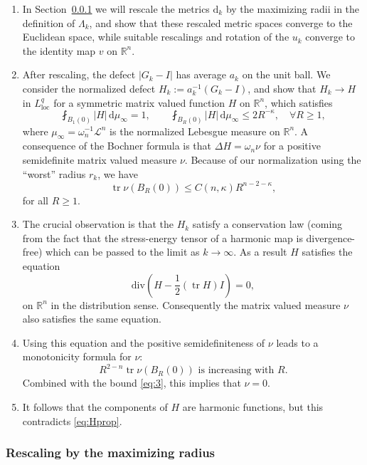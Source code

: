 \documentclass[12pt,a4paper,reqno]{amsart}
\renewcommand{\leq}{\leqslant}
\renewcommand{\geq}{\geqslant}
\newcommand{\tr}{\operatorname{tr}}
\begin{document}
\begin{enumerate}
    \item In Section~\ref{sec:rescaling} we will rescale the metrics $\mathrm{d}_k$ by the maximizing radii in the definition of $\Lambda_k$, and show that these rescaled metric spaces converge to the Euclidean space, while suitable rescalings and rotation of the $u_k$ converge to the identity map $v$ on $\mathbb{R}^n$.
    \item After rescaling, the defect $|G_k - I|$ has average $a_k$ on the unit ball. We consider the normalized defect $H_k := a_k^{-1}(G_k - I)$, and show that $H_k \to H$ in $L^q_{\mathrm{loc}}$ for a symmetric matrix valued function $H$ on $\mathbb{R}^n$, which satisfies
    \begin{equation}\label{eq:Hprop}
\fint_{B_1(0)} |H|\, \mathrm{d}\mu_\infty = 1, \qquad \fint_{B_R(0)} |H| \, \mathrm{d}\mu_\infty \leq 2R^{-\kappa}, \quad \forall R\geq 1, 
    \end{equation}
    where $\mu_\infty=\omega_n^{-1}\mathcal{L}^n$ is the normalized Lebesgue measure on $\mathbb R^n$.
    A consequence of the Bochner formula is that $\Delta H = \omega_n \nu$ for a positive semidefinite matrix valued measure $\nu$. Because of our normalization using the ``worst'' radius $r_k$, we have 
    \begin{equation}\label{eq:3} \tr \nu(B_R(0)) \leq C(n, \kappa) R^{n-2-\kappa}, 
    \end{equation} 
    for all $R \geq 1$. 
    \item The crucial observation is that the $H_k$ satisfy a conservation law (coming from the fact that the stress-energy tensor of a harmonic map is divergence-free) which can be passed to the limit as $k\to \infty$. As a result $H$ satisfies the equation 
    \[ \mathrm{div}\left( H - \frac{1}{2}(\tr H)I\right) = 0, \]
    on $\mathbb{R}^n$ in the distribution sense. Consequently the matrix valued measure $\nu$ also satisfies the same equation. 
    \item Using this equation and the positive semidefiniteness of $\nu$ leads to a monotonicity formula for $\nu$:
    \[ R^{2-n} \tr \nu(B_R(0)) \text{ is increasing with }R. \]
    Combined with the bound \eqref{eq:3}, this implies that $\nu = 0$.
    \item It follows that the components of $H$ are harmonic functions, but this contradicts \eqref{eq:Hprop}. 
\end{enumerate}


\subsubsection{Rescaling by the maximizing radius}\label{sec:rescaling}
\end{document}

